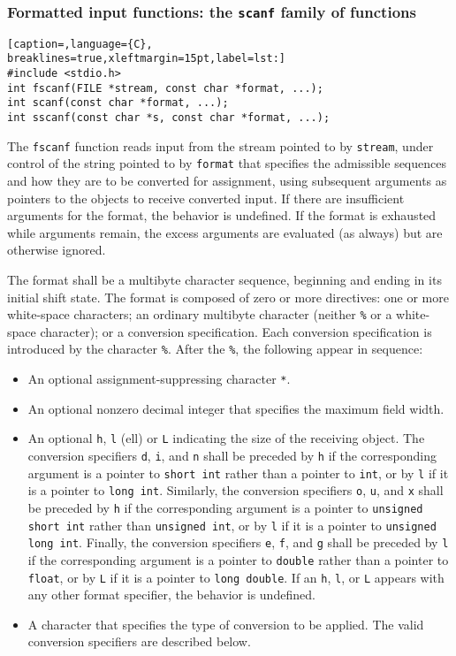 \subsubsection{Formatted input functions: the \texttt{scanf} family of functions}
\lstset{basicstyle=\scriptsize, numbers=left, captionpos=b, tabsize=4}
\begin{lstlisting}[caption=,language={C},
breaklines=true,xleftmargin=15pt,label=lst:]
#include <stdio.h>
int fscanf(FILE *stream, const char *format, ...);
int scanf(const char *format, ...);
int sscanf(const char *s, const char *format, ...);
\end{lstlisting}

The \texttt{fscanf} function reads input from the stream pointed to by
\texttt{stream}, under control of the string pointed to by \texttt{format} that
specifies the admissible sequences and how they are to be converted for
assignment, using subsequent arguments as pointers to the objects to receive
converted input. If there are insufficient arguments for the format, the
behavior is undefined. If the format is exhausted while arguments remain, the
excess arguments are evaluated (as always) but are otherwise ignored.

The format shall be a multibyte character sequence, beginning and ending in its
initial shift state. The format is composed of zero or more directives: one or
more white-space characters; an ordinary multibyte character (neither
\texttt{\%} or a white-space character); or a conversion specification. Each
conversion specification is introduced by the character \texttt{\%}. After the
\texttt{\%}, the following appear in sequence:

\begin{itemize}
	\item An optional assignment-suppressing character \texttt{*}.
	\item An optional nonzero decimal integer that specifies the maximum field
width.
	\item An optional \texttt{h}, \texttt{l} (ell) or \texttt{L} indicating the
size of the receiving object. The conversion specifiers \texttt{d}, \texttt{i},
and \texttt{n} shall be preceded by \texttt{h} if the corresponding argument is
a pointer to \texttt{short int} rather than a pointer to \texttt{int}, or by
\texttt{l} if it is a pointer to \texttt{long int}. Similarly, the conversion
specifiers \texttt{o}, \texttt{u}, and \texttt{x} shall be preceded by
\texttt{h} if the corresponding argument is a pointer to \texttt{unsigned short
int} rather than \texttt{unsigned int}, or by \texttt{l} if it is a pointer to
\texttt{unsigned long int}. Finally, the conversion specifiers \texttt{e},
\texttt{f}, and \texttt{g} shall be preceded by \texttt{l} if the corresponding
argument is a pointer to \texttt{double} rather than a pointer to
\texttt{float}, or by \texttt{L} if it is a pointer to \texttt{long double}. If
an \texttt{h}, \texttt{l}, or \texttt{L} appears with any other format
specifier, the behavior is undefined.
	\item A character that specifies the type of conversion to be applied. The
valid conversion specifiers are described below.
\end{itemize}

